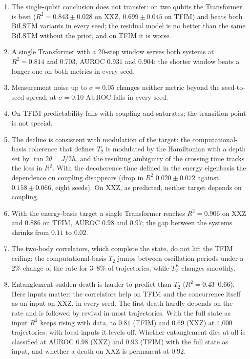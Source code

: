 \documentclass[twocolumn,10pt]{article}
\begin{document}
\begin{enumerate}
  \item The single-qubit conclusion does not transfer: on two qubits the
    Transformer is best ($R^2 = 0.843 \pm 0.028$ on XXZ,
    $0.699 \pm 0.045$ on TFIM) and beats both BiLSTM variants in every
    seed; the residual model is no better than the same BiLSTM without
    the prior, and on TFIM it is worse.
  \item A single Transformer with a 20-step window serves both systems
    at $R^2 = 0.814$ and $0.703$, AUROC $0.931$ and $0.904$; the shorter
    window beats a longer one on both metrics in every seed.
  \item Measurement noise up to $\sigma = 0.05$ changes neither metric
    beyond the seed-to-seed spread; at $\sigma = 0.10$ AUROC falls in
    every seed.
  \item On TFIM predictability falls with coupling and saturates; the
    transition point is not special.
  \item The decline is consistent with modulation of the target: the
    computational-basis coherence that defines $T_2$ is modulated by the
    Hamiltonian with a depth set by $\tan2\theta = J/2h$, and the
    resulting ambiguity of the crossing time tracks the loss in $R^2$.
    With the decoherence time defined in the energy eigenbasis the
    dependence on coupling disappears (drop in $R^2$ $0.020 \pm 0.072$
    against $0.158 \pm 0.066$, eight seeds). On XXZ, as predicted,
    neither target depends on coupling.
  \item With the energy-basis target a single Transformer reaches
    $R^2 = 0.906$ on XXZ and $0.886$ on TFIM, AUROC $0.98$ and $0.97$;
    the gap between the systems shrinks from $0.11$ to $0.02$.
  \item The two-body correlators, which complete the state, do not lift
    the TFIM ceiling: the computational-basis $T_2$ jumps between
    oscillation periods under a $2\%$ change of the rate for $3$--$8\%$
    of trajectories, while $T_2^E$ changes smoothly.
  \item Entanglement sudden death is harder to predict than $T_2$
    ($R^2 = 0.43$--$0.66$). Here inputs matter: the correlators help on
    TFIM and the concurrence itself as an input on XXZ, in every seed.
    The first death hardly depends on the rate and is followed by
    revival in most trajectories. With the full state as input $R^2$
    keeps rising with data, to $0.81$ (TFIM) and $0.69$ (XXZ) at 4{,}000
    trajectories; with local inputs it levels off. Whether entanglement
    dies at all is classified at AUROC $0.98$ (XXZ) and $0.93$ (TFIM)
    with the full state as input, and whether a death on XXZ is
    permanent at $0.92$.
\end{enumerate}
\end{document}
